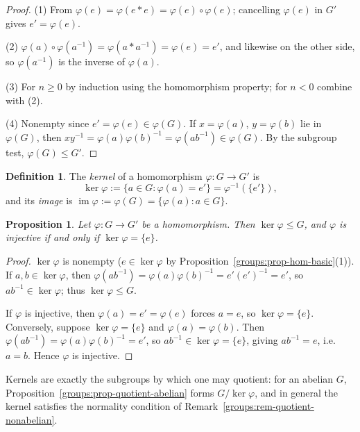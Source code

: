 \documentclass[11pt,a4paper]{article}
\newtheorem{proposition}[theorem]{Proposition}
\theoremstyle{definition}
\newtheorem{definition}[theorem]{Definition}
\theoremstyle{remark}
\DeclareMathOperator{\img}{im}
\begin{document}
\begin{proof}
(1) From \(\varphi(e) = \varphi(e \ast e) = \varphi(e)\circ\varphi(e)\); cancelling \(\varphi(e)\) in \(G'\) gives \(e' = \varphi(e)\).

(2) \(\varphi(a)\circ\varphi(a^{-1}) = \varphi(a \ast a^{-1}) = \varphi(e) = e'\), and likewise on the other side, so \(\varphi(a^{-1})\) is the inverse of \(\varphi(a)\).

(3) For \(n \ge 0\) by induction using the homomorphism property; for \(n < 0\) combine with (2).

(4) Nonempty since \(e' = \varphi(e) \in \varphi(G)\). If \(x = \varphi(a)\), \(y = \varphi(b)\) lie in \(\varphi(G)\), then \(x y^{-1} = \varphi(a)\varphi(b)^{-1} = \varphi(ab^{-1}) \in \varphi(G)\). By the subgroup test, \(\varphi(G) \le G'\).
\end{proof}

\begin{definition}\label{groups:def-kernel}
The \emph{kernel} of a homomorphism \(\varphi \colon G \to G'\) is
\[
\ker\varphi := \{ a \in G : \varphi(a) = e' \} = \varphi^{-1}(\{e'\}),
\]
and its \emph{image} is \(\img\varphi := \varphi(G) = \{\varphi(a) : a \in G\}\).
\end{definition}

\begin{proposition}\label{groups:prop-kernel-injective}
Let \(\varphi \colon G \to G'\) be a homomorphism. Then \(\ker\varphi \le G\), and \(\varphi\) is injective if and only if \(\ker\varphi = \{e\}\).
\end{proposition}

\begin{proof}
\(\ker\varphi\) is nonempty (\(e \in \ker\varphi\) by Proposition~\ref{groups:prop-hom-basic}(1)). If \(a,b \in \ker\varphi\), then \(\varphi(ab^{-1}) = \varphi(a)\varphi(b)^{-1} = e'(e')^{-1} = e'\), so \(ab^{-1} \in \ker\varphi\); thus \(\ker\varphi \le G\).

If \(\varphi\) is injective, then \(\varphi(a)=e'=\varphi(e)\) forces \(a=e\), so \(\ker\varphi = \{e\}\). Conversely, suppose \(\ker\varphi = \{e\}\) and \(\varphi(a) = \varphi(b)\). Then \(\varphi(ab^{-1}) = \varphi(a)\varphi(b)^{-1} = e'\), so \(ab^{-1} \in \ker\varphi = \{e\}\), giving \(ab^{-1} = e\), i.e.\ \(a = b\). Hence \(\varphi\) is injective.
\end{proof}

Kernels are exactly the subgroups by which one may quotient: for an abelian \(G\), Proposition~\ref{groups:prop-quotient-abelian} forms \(G/\ker\varphi\), and in general the kernel satisfies the normality condition of Remark~\ref{groups:rem-quotient-nonabelian}.
\end{document}
